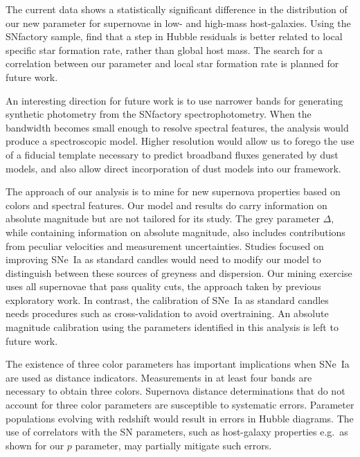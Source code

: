 \documentclass[trackchanges]{aastex62}   	%
\begin{document}
The current data shows a statistically significant difference in the distribution of our new parameter for supernovae
in low- and high-mass host-galaxies.
Using the SNfactory sample,
\citet{2017Rigault} find that a step in Hubble residuals is better related to local 
specific
star 
formation rate, rather than
global host mass.  The search for a correlation between our parameter and local star formation rate is planned for future work.

An interesting direction for future work is to use narrower bands for generating synthetic photometry
from the SNfactory spectrophotometry.  When the bandwidth becomes small enough
to resolve spectral features, the analysis would produce a spectroscopic model.   Higher resolution would allow us to forego 
the use of a fiducial template necessary to predict broadband fluxes generated by dust models, and also allow direct incorporation
of dust models into our framework.


The approach of our analysis is to mine for new supernova properties based on colors and spectral features.
Our model and results do carry information on absolute magnitude but are not tailored for its study.
The grey parameter $\Delta$, while containing information on absolute magnitude, 
also 
includes
contributions from peculiar velocities and measurement uncertainties.  Studies
focused on improving SNe~Ia as standard candles 
would need to
modify  our model to
distinguish between these sources of greyness and dispersion.
Our
mining exercise uses all supernovae that pass quality cuts, the approach taken by previous
exploratory work.  In contrast, the calibration of SNe~Ia as standard candles needs procedures such
as cross-validation to avoid overtraining.
An absolute magnitude calibration using the parameters identified in this analysis is left to future work.

The existence of three color parameters  has important implications when SNe~Ia are used as distance indicators.
Measurements in at least four bands are necessary to obtain three colors.  
Supernova distance determinations that do not account for three color parameters are susceptible to 
systematic errors.  
Parameter populations evolving with redshift would result in errors in
Hubble diagrams.
The use of  correlators with the SN parameters, such as host-galaxy properties e.g.\ as shown for our $p$ parameter,
may partially mitigate such errors.
\end{document}
